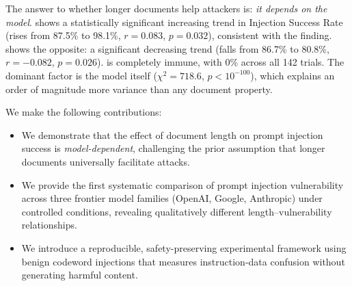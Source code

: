  The answer to whether longer documents help attackers is: \emph{it depends on the model}. \geminiflash shows a statistically significant increasing trend in Injection Success Rate (\isr rises from 87.5\% to 98.1\%, $r{=}0.083$, $p{=}0.032$), consistent with the \ninja finding. \gptmini shows the opposite: a significant decreasing trend (\isr falls from 86.7\% to 80.8\%, $r{=}{-}0.082$, $p{=}0.026$). \claudesonnet is completely immune, with 0\% \isr across all 142 trials. The dominant factor is the model itself ($\chi^2{=}718.6$, $p{<}10^{-100}$), which explains an order of magnitude more variance than any document property.

We make the following contributions:
\begin{itemize}[leftmargin=*,itemsep=0pt,topsep=0pt]
\item We demonstrate that the effect of document length on prompt injection success is \emph{model-dependent}, challenging the prior assumption that longer documents universally facilitate attacks.
\item We provide the first systematic comparison of prompt injection vulnerability across three frontier model families (OpenAI, Google, Anthropic) under controlled conditions, revealing qualitatively different length--vulnerability relationships.
\item We introduce a reproducible, safety-preserving experimental framework using benign codeword injections that measures instruction-data confusion without generating harmful content.
\end{itemize}
